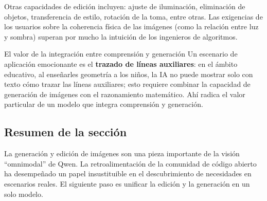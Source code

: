 Otras capacidades de edición incluyen: ajuste de iluminación, eliminación de objetos, transferencia de estilo, rotación de la toma, entre otras. Las exigencias de los usuarios sobre la coherencia física de las imágenes (como la relación entre luz y sombra) superan por mucho la intuición de los ingenieros de algoritmos.

\begin{knowledgebox}{El valor de la integración entre comprensión y generación}
Un escenario de aplicación emocionante es el \textbf{trazado de líneas auxiliares}: en el ámbito educativo, al enseñarles geometría a los niños, la IA no puede mostrar solo con texto cómo trazar las líneas auxiliares; esto requiere combinar la capacidad de generación de imágenes con el razonamiento matemático. Ahí radica el valor particular de un modelo que integra comprensión y generación.
\end{knowledgebox}

\subsection{Resumen de la sección}

La generación y edición de imágenes son una pieza importante de la visión ``omnimodal'' de Qwen. La retroalimentación de la comunidad de código abierto ha desempeñado un papel insustituible en el descubrimiento de necesidades en escenarios reales. El siguiente paso es unificar la edición y la generación en un solo modelo.
